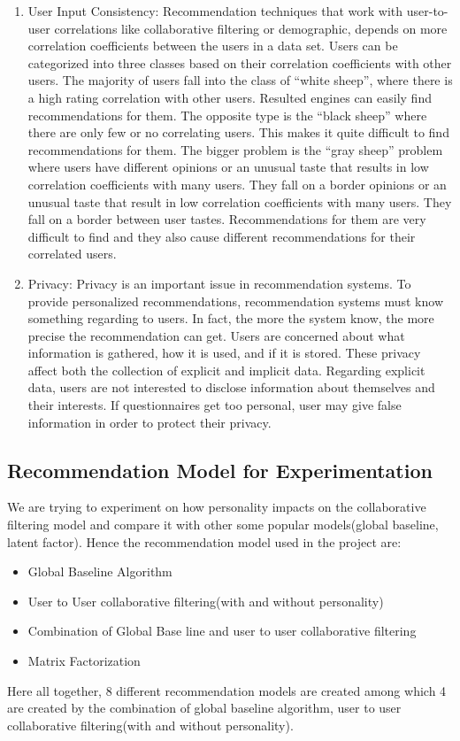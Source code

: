 \begin{enumerate}
\item User Input Consistency: Recommendation techniques that work with user-to-user correlations like collaborative filtering or demographic, depends on more correlation coefficients between the users in a data set. Users can be categorized into three classes based on their correlation coefficients with other users. The majority of users fall into the class of ``white sheep'', where there is a high rating correlation with other users. Resulted engines can easily find recommendations for them. The opposite type is the ``black sheep'' where there are only few or no correlating users. This makes it quite difficult to find recommendations for them. The bigger problem is the ``gray sheep'' problem where users have different opinions or an unusual taste that results in low correlation coefficients with many users. They fall on a border opinions or an unusual taste that result in low correlation coefficients with many users. They fall on a border between user tastes. Recommendations for them are very difficult to find and they also cause different recommendations for their correlated users.
\item Privacy: Privacy is an important issue in recommendation systems. To provide personalized recommendations, recommendation systems must know something regarding to users. In fact, the more the system know, the more precise the recommendation can get. Users are concerned about what information is gathered, how it is used, and if it is stored. These privacy affect both the collection of explicit and implicit data. Regarding explicit data, users are not interested to disclose information about themselves and their interests. If questionnaires get too personal, user may give false information in order to protect their privacy.
\end{enumerate}
\subsection{Recommendation Model for Experimentation}
We are trying to experiment on how personality impacts on the collaborative filtering model and compare it with other some popular models(global baseline, latent factor).
Hence the recommendation model used in the project are:
\begin{itemize}
\item Global Baseline Algorithm
\item User to User collaborative filtering(with and without personality)
\item Combination of Global Base line and user to user collaborative filtering
\item Matrix Factorization
\end{itemize}
Here all together, 8 different recommendation models are created among which 4 are created by the combination of global baseline algorithm, user to user collaborative filtering(with and without personality).

